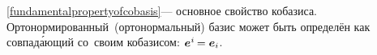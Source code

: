 \begin{otherlanguage}{russian}

\eqref{fundamentalpropertyofcobasis}\:--- основное свойство кобазиса.
Орто\-нормирован\-ный~(орто\-нормаль\-ный) базис может быть определён как совпад\'{а}ющий со~своим кобазисом\::
${\bm{e}^{\hspace{.05ex}i} \hspace{-0.2ex} = \bm{e}_{i}}$.


\begin{comment} %
\vspace{-0.5em}\[
\bm{a}_i \dotp \bm{a}^{\hspace{.1ex}j} \hspace{-0.1ex} = \hspace{-0.2ex}
\scalebox{0.8}[0.8]{$\left[ \begin{array}{ccc}
\bm{a}_1 \hspace{-0.1ex} \dotp \bm{a}^{\hspace{-0.1ex}1} & \bm{a}_1 \hspace{-0.1ex} \dotp \bm{a}^2 & \bm{a}_1 \hspace{-0.1ex} \dotp \bm{a}^3 \\
\bm{a}_2 \hspace{-0.1ex} \dotp \bm{a}^{\hspace{-0.1ex}1} & \bm{a}_2 \hspace{-0.1ex} \dotp \bm{a}^2 & \bm{a}_2 \hspace{-0.1ex} \dotp \bm{a}^3 \\
\bm{a}_3 \hspace{-0.1ex} \dotp \bm{a}^{\hspace{-0.1ex}1} & \bm{a}_3 \hspace{-0.1ex} \dotp \bm{a}^2 & \bm{a}_3 \hspace{-0.1ex} \dotp \bm{a}^3
\end{array} \right]$} \!=\!
\scalebox{0.8}[0.8]{$\left[ \begin{array}{ccc}
1 & 0 & 0 \\
0 & 1 & 0 \\
0 & 0 & 1
\end{array} \right]$} \!=
\hspace{.1ex} \delta_i^{\hspace{.1ex}j}
\]
\end{comment} %


\end{otherlanguage}
